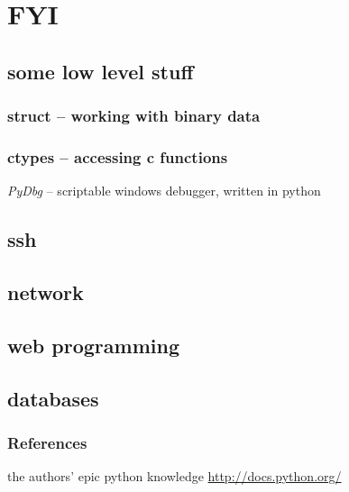 \documentclass{beamer}
\begin{document}
\section{FYI}

\subsection*{some low level stuff}	%

\begin{frame}
	\frametitle{struct -- working with binary data}
\end{frame}

\begin{frame}
	\frametitle{ctypes -- accessing c functions}
	\emph{PyDbg} -- scriptable windows debugger, written in python
\end{frame}

\subsection*{ssh}

\subsection*{network}

\subsection*{web programming}

\subsection*{databases}

\begin{frame}
	\frametitle{References}
	\begin{thebibliography}{3}
	 the authors' epic python knowledge
	 \url{http://docs.python.org/}
	\end{thebibliography}
\end{frame}
\end{document}
